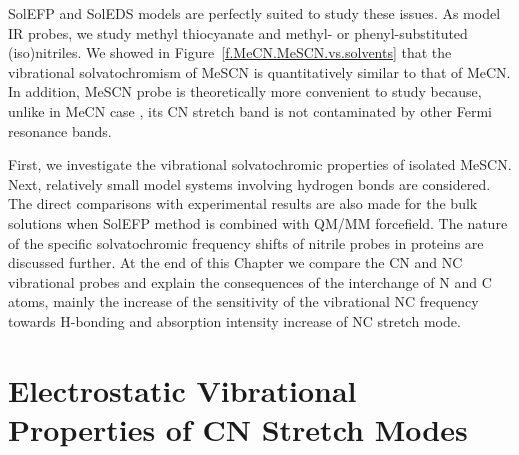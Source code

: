\documentclass[b5paper,oneside,fleqn,11pt]{book}
\begin{document}
\begin{refsection}
SolEFP and SolEDS models are
perfectly suited to study these issues. As model 
IR probes, we study methyl thiocyanate and methyl\hyp{} 
or phenyl\hyp{}substituted (iso)nitriles.
We showed in Figure~\ref{f.MeCN.MeSCN.vs.solvents} 
that the vibrational solvatochromism of MeSCN is
quantitatively similar to that of MeCN. In addition, 
MeSCN probe is theoretically more convenient to study
because, unlike in MeCN case \citep{Suzuki.Nakagawa.Fujiyama.SCActaA.1977}, 
its CN stretch band is not
contaminated by other Fermi resonance bands.

First, we investigate
the vibrational solvatochromic properties of isolated
MeSCN. Next, relatively small model systems
involving hydrogen bonds are considered. The direct
comparisons with experimental results are also made for the bulk
solutions when SolEFP method is combined with QM/MM forcefield. 
The nature of the specific
solvatochromic frequency shifts of nitrile probes in proteins
are discussed further. At the end of this Chapter we compare
the CN and NC vibrational probes and explain the consequences of the 
interchange of N and C atoms, mainly the increase of the sensitivity
of the vibrational NC frequency
towards H-bonding and absorption intensity increase of NC stretch mode.

\section{Electrostatic Vibrational Properties of CN Stretch Modes}


\end{refsection}
\end{document}
